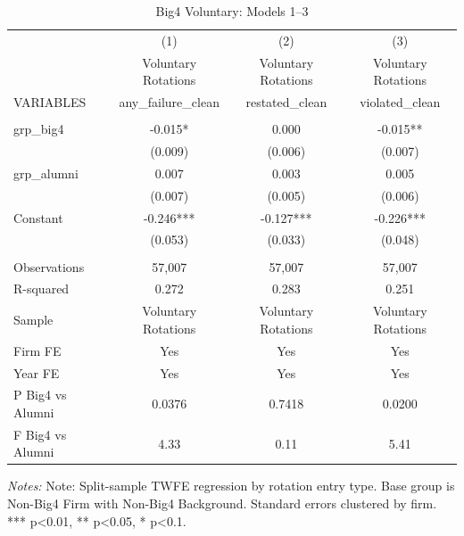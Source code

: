 \begin{table}[htbp]
\footnotesize
\centering
\caption{Big4 Voluntary: Models 1--3}
\begin{threeparttable}
\begin{tabular}{p{}ccc}
\toprule
 & (1) & (2) & (3) \\
 & Voluntary Rotations & Voluntary Rotations & Voluntary Rotations \\
VARIABLES & any\_failure\_clean & restated\_clean & violated\_clean \\
\midrule
 &  &  &  \\
grp\_big4 & -0.015* & 0.000 & -0.015** \\
 & (0.009) & (0.006) & (0.007) \\
grp\_alumni & 0.007 & 0.003 & 0.005 \\
 & (0.007) & (0.005) & (0.006) \\
Constant & -0.246*** & -0.127*** & -0.226*** \\
 & (0.053) & (0.033) & (0.048) \\
 &  &  &  \\
Observations & 57,007 & 57,007 & 57,007 \\
R-squared & 0.272 & 0.283 & 0.251 \\
Sample & Voluntary Rotations & Voluntary Rotations & Voluntary Rotations \\
Firm FE & Yes & Yes & Yes \\
Year FE & Yes & Yes & Yes \\
P Big4 vs Alumni & 0.0376 & 0.7418 & 0.0200 \\
F Big4 vs Alumni & 4.33 & 0.11 & 5.41 \\
\bottomrule
\end{tabular}
\begin{tablenotes}\footnotesize
\item \raggedright \textit{Notes:} Note: Split-sample TWFE regression by rotation entry type. Base group is Non-Big4 Firm with Non-Big4 Background. Standard errors clustered by firm. *** p<0.01, ** p<0.05, * p<0.1.
\end{tablenotes}
\end{threeparttable}
\end{table}
